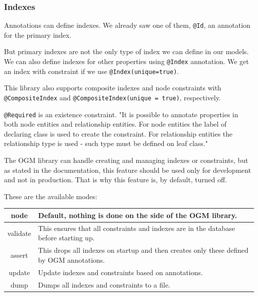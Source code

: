 \subsubsection {Indexes}

Annotations can define indexes. We already saw one of them, \texttt{@Id}, an annotation for the primary index.

But primary indexes are not the only type of index we can define in our models. We can also define indexes for other
properties using \texttt{@Index} annotation. We get an index with constraint if we use \texttt{@Index(unique=true)}.

This library also supports composite indexes and node constraints with \texttt{@CompositeIndex} and \texttt{@CompositeIndex(unique = true)}, respectively.

\texttt{@Required} is an existence constraint. "It is possible to annotate properties in both node entities and relationship entities. For node entities
the label of declaring class is used to create the constraint. For relationship entities the relationship type is used - such type must be defined on leaf class." \cite{noauthor_reference_nodate}

The OGM library can handle creating and managing indexes or constraints, but as stated in the documentation, this feature should be used only for development
and not in production. That is why this feature is, by default, turned off.


These are the available modes:
\begin{table}[H]
    \begin{center}
        \begin{tabularx}{\textwidth}{|c|p{}|}
            \hline
            node     & Default, nothing is done on the side of the OGM library.                                  \\
            \hline
            validate & This ensures that all constraints and indexes are in the database before starting up.     \\
            \hline
            assert   & This drops all indexes on startup and then creates only these defined by OGM annotations. \\
            \hline
            update   & Update indexes and constraints based on annotations.                                      \\
            \hline
            dump     & Dumps all indexes and constraints to a file.                                              \\
            \hline
        \end{tabularx}
    \end{center}
\end{table}

